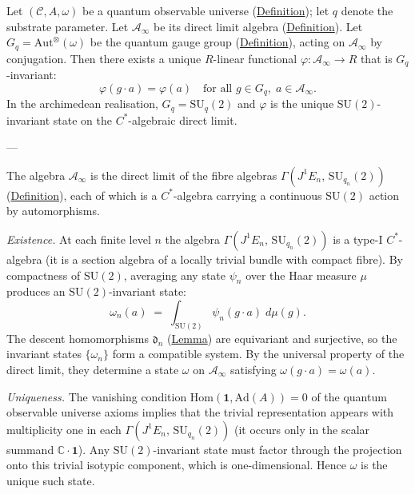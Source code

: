 \begin{proposition}
  \label{prop:vacuum-state}
Let $(\mathcal{C}, A, \omega)$ be a quantum observable universe
(\hyperref[def:quantum-observable-universe]{Definition}); let $q$ denote the substrate parameter.  Let
$\mathcal{A}_\infty$ be its direct limit algebra
(\hyperref[def:direct-limit-algebra]{Definition}).  Let $G_q =
\mathrm{Aut}^{\otimes}(\omega)$ be the quantum gauge group
(\hyperref[def:quantum-gauge-group]{Definition}), acting on
$\mathcal{A}_\infty$ by conjugation.  Then there exists a unique
$R$-linear functional
$\varphi \colon \mathcal{A}_\infty \to R$ that is $G_q$-invariant:
\[
\varphi(g \cdot a) = \varphi(a)
  \quad\text{for all } g \in G_q,\;
  a \in \mathcal{A}_\infty.
\]
In the archimedean realisation, $G_q = \mathrm{SU}_q(2)$ and
$\varphi$ is the unique $\mathrm{SU}(2)$-invariant state on the
$C^*$-algebraic direct limit.

---

The algebra $\mathcal{A}_\infty$ is the direct limit of the fibre algebras
$\Gamma(J^1 E_n,\, \mathrm{SU}_{q_n}(2))$
(\hyperref[def:direct-limit-algebra]{Definition}), each of which is a
$C^*$-algebra carrying a continuous $\mathrm{SU}(2)$ action by automorphisms.

\emph{Existence.}
At each finite level $n$ the algebra
$\Gamma(J^1 E_n,\, \mathrm{SU}_{q_n}(2))$ is a type-I $C^*$-algebra
(it is a section algebra of a locally trivial bundle with compact fibre).
By compactness of $\mathrm{SU}(2)$, averaging any state $\psi_n$ over the
Haar measure $\mu$ produces an $\mathrm{SU}(2)$-invariant state:
\[
\omega_n(a)
  \;=\;
  \int_{\mathrm{SU}(2)} \psi_n(g \cdot a)\; d\mu(g).
\]
The descent homomorphisms $\mathfrak{d}_n$ (\hyperref[lem:descent]{Lemma}) are
equivariant and surjective, so the invariant states $\{\omega_n\}$ form a
compatible system.  By the universal property of the direct limit, they
determine a state $\omega$ on $\mathcal{A}_\infty$ satisfying
$\omega(g \cdot a) = \omega(a)$.

\emph{Uniqueness.}
The vanishing condition
$\mathrm{Hom}(\mathbf{1}, \mathrm{Ad}(A)) = 0$ of the quantum observable
universe axioms implies that the trivial representation appears with
multiplicity one in each $\Gamma(J^1 E_n,\, \mathrm{SU}_{q_n}(2))$ (it
occurs only in the scalar summand $\mathbb{C} \cdot \mathbf{1}$).  Any
$\mathrm{SU}(2)$-invariant state must factor through the projection onto
this trivial isotypic component, which is one-dimensional.  Hence
$\omega$ is the unique such state.
\end{proposition}
